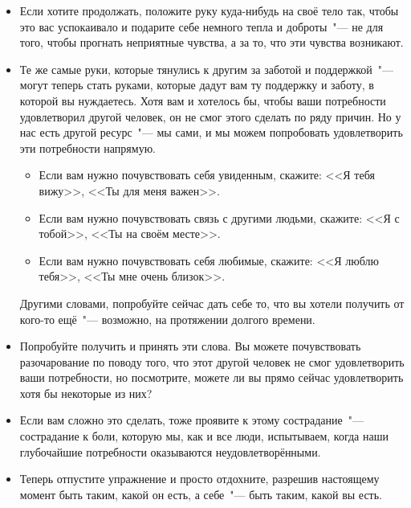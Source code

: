 \begin{itemize}
	\item Если хотите продолжать, положите руку куда-нибудь на своё тело так, чтобы это вас успокаивало и подарите себе немного тепла и доброты~"--- не для того, чтобы прогнать неприятные чувства, а за то, что эти чувства возникают.
	
	\item Те же самые руки, которые тянулись к другим за заботой и поддержкой~"--- могут теперь стать руками, которые дадут вам ту поддержку и заботу, в которой вы нуждаетесь. Хотя вам и хотелось бы, чтобы ваши потребности удовлетворил другой человек, он не смог этого сделать по ряду причин. Но у нас есть другой ресурс~"--- мы сами, и мы можем попробовать удовлетворить эти потребности напрямую.
	\begin{itemize}
		\item Если вам нужно почувствовать себя увиденным, скажите: <<Я тебя вижу>>, <<Ты для меня важен>>.
		\item Если вам нужно почувствовать связь с другими людьми, скажите: <<Я с тобой>>, <<Ты на своём месте>>.
		\item Если вам нужно почувствовать себя любимые, скажите: <<Я люблю тебя>>, <<Ты мне очень близок>>.
	\end{itemize}
	Другими словами, попробуйте сейчас дать себе то, что вы хотели получить от кого-то ещё~"--- возможно, на протяжении долгого времени.
	
	\item Попробуйте получить и принять эти слова. Вы можете почувствовать разочарование по поводу того, что этот другой человек не смог удовлетворить ваши потребности, но посмотрите, можете ли вы прямо сейчас удовлетворить хотя бы некоторые из них?
	
	\item Если вам сложно это сделать, тоже проявите к этому сострадание~"--- сострадание к боли, которую мы, как и все люди, испытываем, когда наши глубочайшие потребности оказываются неудовлетворёнными.
	
	\item Теперь отпустите упражнение и просто отдохните, разрешив настоящему момент быть таким, какой он есть, а себе~"--- быть таким, какой вы есть.
\end{itemize}

